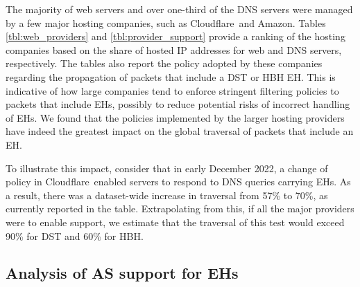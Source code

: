 \documentclass[conference]{IEEEtran}
\begin{document}
The majority of web servers and over one-third of the
DNS servers were managed by a few major hosting companies, such
as Cloudflare\texttrademark\ and Amazon\texttrademark.  Tables
\ref{tbl:web_providers} and \ref{tbl:provider_support} provide a ranking of the
hosting companies based on the share of hosted IP addresses for web and DNS
servers, respectively. The tables also report the policy adopted by these
companies regarding the propagation of packets that include a DST or HBH EH.  
This is indicative of how large companies tend to enforce stringent filtering policies to
packets that include EHs, possibly to reduce potential
risks of incorrect handling of EHs.  We found that the policies implemented by
the larger hosting providers have indeed the greatest impact on the global
traversal of packets that include an EH. 



To illustrate this impact, consider that in early December 2022, a change of
policy in Cloudflare\texttrademark\ enabled servers to respond to DNS queries
carrying EHs.  As a result, there was a dataset-wide increase in traversal
from 57\% to 70\%, as currently reported in the table.  Extrapolating from
this, if all the major providers were to enable support, we estimate that the
traversal of this test would exceed 90\% for DST and 60\% for HBH.


\subsection{Analysis of AS support for EHs}
\end{document}
